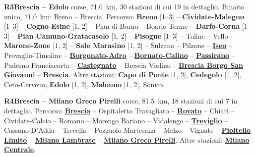 \medskip\noindent\hypertarget{lin:R3}{\textbf{R3\enspace Brescia -- Edolo}} corse, \SI{71,0}{\km}, 30 stazioni di cui 19 in dettaglio. Binario unico, \SI{71,0}{\km}: Breno -- Brescia. Percorso: \hypertarget{sta:S01005}{\textbf{Breno}} [1--3] -- \hypertarget{sta:S01774}{\textbf{Cividate-Malegno}} [1--3] -- \hypertarget{sta:S01775}{\textbf{Cogno-Esine}} [1, 2] -- Pian di Borno -- Boario Terme -- \hypertarget{sta:S01006}{\textbf{Darfo-Corna}} [1--3] -- \hypertarget{sta:S01780}{\textbf{Pian Camuno-Gratacasolo}} [1, 2] -- \hypertarget{sta:S01014}{\textbf{Pisogne}} [1--3] -- Toline -- Vello -- \hypertarget{sta:S01783}{\textbf{Marone-Zone}} [1, 2] -- \hypertarget{sta:S01784}{\textbf{Sale Marasino}} [1, 2] -- Sulzano -- Pilzone -- \hyperlink{sta:S01021}{\textbf{Iseo}} -- Provaglio-Timoline -- \hyperlink{sta:S01788}{\textbf{Borgonato-Adro}} -- \hyperlink{sta:S01789}{\textbf{Bornato-Calino}} -- \hyperlink{sta:S01793}{\textbf{Passirano}} -- Paderno Franciacorta -- \hyperlink{sta:S01795}{\textbf{Castegnato}} -- Brescia Violino -- \hyperlink{sta:S01797}{\textbf{Brescia Borgo San Giovanni}} -- \hyperlink{sta:S09999}{\textbf{Brescia}}. Altre stazioni: \hypertarget{sta:S01771}{\textbf{Capo di Ponte}} [1, 2], \hypertarget{sta:S01769}{\textbf{Cedegolo}} [1, 2], Ceto-Cerveno, \hypertarget{sta:S01002}{\textbf{Edolo}} [1, 2], \hypertarget{sta:S01767}{\textbf{Malonno}} [1, 2], Sonico.

\medskip\noindent\hypertarget{lin:R4}{\textbf{R4\enspace Brescia -- Milano Greco Pirelli}} corse, \SI{81,5}{\km}, 18 stazioni di cui 7 in dettaglio. Percorso: \hyperlink{sta:S09999}{\textbf{Brescia}} -- Ospitaletto Travagliato -- \hyperlink{sta:S01714}{\textbf{Rovato}} -- Chiari -- Cividate-Calcio -- Romano -- Morengo Bariano -- Vidalengo -- \hyperlink{sta:S01708}{\textbf{Treviglio}} -- Cassano D'Adda -- Trecella -- Pozzuolo Martesana -- Melzo -- Vignate -- \hyperlink{sta:S01703}{\textbf{Pioltello Limito}} -- \hyperlink{sta:S01701}{\textbf{Milano Lambrate}} -- \hyperlink{sta:S01326}{\textbf{Milano Greco Pirelli}}. Altre stazioni: \hyperlink{sta:S01700}{\textbf{Milano Centrale}}.

